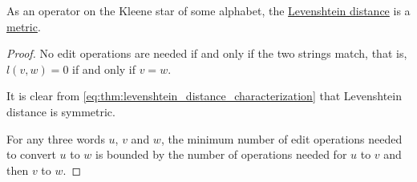 \begin{proposition}\label{thm:levenshtein_distance_metric}
  As an operator on the Kleene star of some alphabet, the \hyperref[def:levenshtein_distance]{Levenshtein distance} is a \hyperref[def:metric_space]{metric}.
\end{proposition}
\begin{proof}
   No edit operations are needed if and only if the two strings match, that is, \( l(v, w) = 0 \) if and only if \( v = w \).

   It is clear from \eqref{eq:thm:levenshtein_distance_characterization} that Levenshtein distance is symmetric.

   For any three words \( u \), \( v \) and \( w \), the minimum number of edit operations needed to convert \( u \) to \( w \) is bounded by the number of operations needed for \( u \) to \( v \) and then \( v \) to \( w \).
\end{proof}

